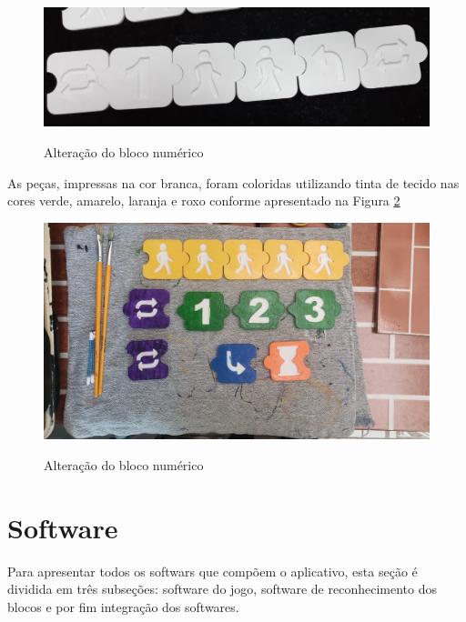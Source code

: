     \begin{figure}[H]
        \caption{Alteração do bloco numérico}
        \centering
        \includegraphics[width=\linewidth]{Imagens/Cap4/alteracao_bloco_numerico.jpg}
        \label{figura:alteracao_bloco_numerico}
    \end{figure}
    
    As peças, impressas na cor branca, foram coloridas utilizando tinta de tecido nas cores verde, amarelo, laranja e roxo conforme apresentado na Figura \ref{figura:blocos_pintados}
    
    \begin{figure}[H]
        \caption{Alteração do bloco numérico}
        \centering
        \includegraphics[width=\linewidth]{Imagens/Cap4/blocos_pintados.jpeg}
        \label{figura:blocos_pintados}
    \end{figure}

\section{Software}

Para apresentar todos os softwars que compõem o aplicativo, esta seção é dividida em três subseções: software do jogo, software de reconhecimento dos blocos e por fim integração dos softwares.

